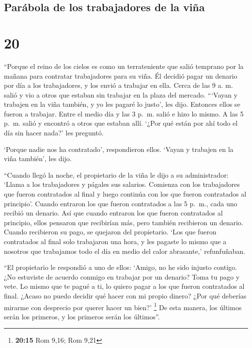 \hypertarget{paruxe1bola-de-los-trabajadores-de-la-viuxf1a}{%
\subsection{Parábola de los trabajadores de la
viña}\label{paruxe1bola-de-los-trabajadores-de-la-viuxf1a}}

\hypertarget{section-19}{%
\section{20}\label{section-19}}

 ``Porque el reino de los cielos es como un terrateniente
que salió temprano por la mañana para contratar trabajadores para su
viña.  Él decidió pagar un denario por día a los
trabajadores, y los envió a trabajar en ella.  Cerca de
las 9 a. m. salió y vio a otros que estaban sin trabajar en la plaza del
mercado.  ```Vayan y trabajen en la viña también, y yo les
pagaré lo justo', les dijo. Entonces ellos se fueron a trabajar.
 Entre el medio día y las 3 p.~m. salió e hizo lo mismo.
 A las 5 p.~m. salió y encontró a otros que estaban allí.
`¿Por qué están por ahí todo el día sin hacer nada?' les preguntó.

 `Porque nadie nos ha contratado', respondieron ellos.
`Vayan y trabajen en la viña también', les dijo.

 ``Cuando llegó la noche, el propietario de la viña le
dijo a su administrador: `Llama a los trabajadores y págales sus
salarios. Comienza con los trabajadores que fueron contratados al final
y luego continúa con los que fueron contratados al principio'.
 Cuando entraron los que fueron contratados a las 5 p.~m.,
cada uno recibió un denario.  Así que cuando entraron los
que fueron contratados al principio, ellos pensaron que recibirían más,
pero también recibieron un denario.  Cuando recibieron su
pago, se quejaron del propietario.  `Los que fueron
contratados al final solo trabajaron una hora, y les pagaste lo mismo
que a nosotros que trabajamos todo el día en medio del calor abrasante,'
refunfuñaban.

 ``El propietario le respondió a uno de ellos: `Amigo, no
he sido injusto contigo. ¿No estuviste de acuerdo conmigo en trabajar
por un denario?  Toma tu pago y vete. Lo mismo que te
pagué a ti, lo quiero pagar a los que fueron contratados al final.
 ¿Acaso no puedo decidir qué hacer con mi propio dinero?
¿Por qué deberías mirarme con desprecio por querer hacer un bien?'
\footnote{\textbf{20:15} Rom 9,16; Rom 9,21}  De esta
manera, los últimos serán los primeros, y los primeros serán los
últimos''.


